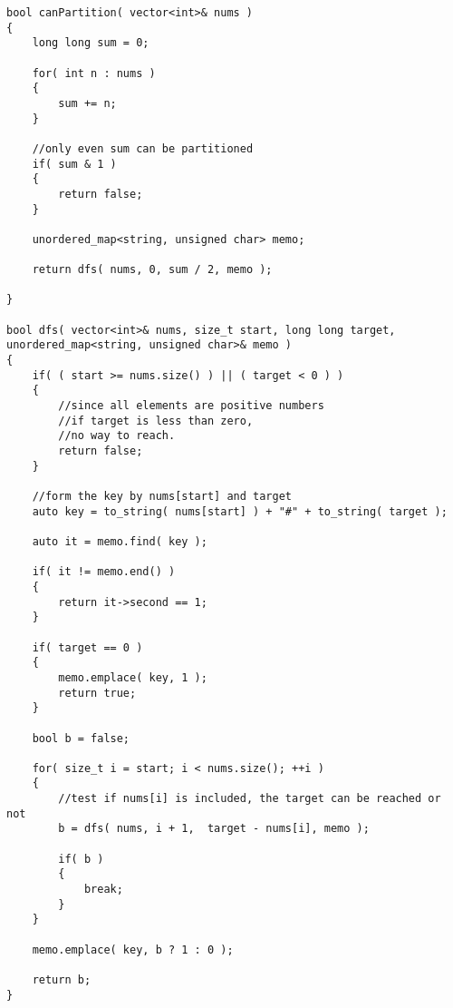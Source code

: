 \setcounter{lstlisting}{0}
\begin{lstlisting}[style=customc, caption={Top Down Dynamic Programming}]
bool canPartition( vector<int>& nums )
{
    long long sum = 0;

    for( int n : nums )
    {
        sum += n;
    }

    //only even sum can be partitioned
    if( sum & 1 )
    {
        return false;
    }

    unordered_map<string, unsigned char> memo;

    return dfs( nums, 0, sum / 2, memo );

}

bool dfs( vector<int>& nums, size_t start, long long target, unordered_map<string, unsigned char>& memo )
{
    if( ( start >= nums.size() ) || ( target < 0 ) )
    {
        //since all elements are positive numbers
        //if target is less than zero,
        //no way to reach.
        return false;
    }

    //form the key by nums[start] and target
    auto key = to_string( nums[start] ) + "#" + to_string( target );

    auto it = memo.find( key );

    if( it != memo.end() )
    {
        return it->second == 1;
    }

    if( target == 0 )
    {
        memo.emplace( key, 1 );
        return true;
    }

    bool b = false;

    for( size_t i = start; i < nums.size(); ++i )
    {
        //test if nums[i] is included, the target can be reached or not
        b = dfs( nums, i + 1,  target - nums[i], memo );

        if( b )
        {
            break;
        }
    }

    memo.emplace( key, b ? 1 : 0 );

    return b;
}

\end{lstlisting}

